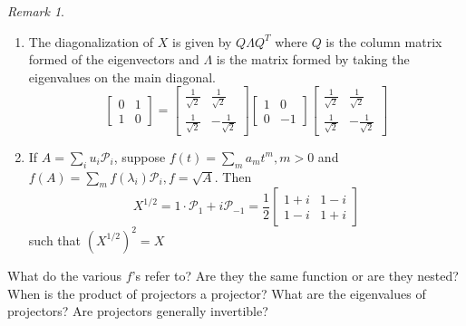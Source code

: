 \documentclass[12pt]{article}
\newcommand{\Proj}{\mathcal{P}}
\theoremstyle{definition}
\theoremstyle{remark}
\newtheorem*{remark}{Remark}
\newenvironment{question}[2][QUESTION]{\begin{trivlist}
\item[\hskip \labelsep {\bfseries #1}\hskip \labelsep {\bfseries #2.}]}{\end{trivlist}}
\begin{document}
    \begin{remark}
       \begin{enumerate}
         \item The diagonalization of $X$ is given by $Q\Lambda Q^T$ where $Q$ is the column matrix formed of the eigenvectors and $\Lambda$ is the matrix formed by taking the eigenvalues on the main diagonal.
         $$
            \begin{bmatrix}
              0 & 1 \\ 1 & 0   
            \end{bmatrix} 
            =
            \begin{bmatrix}
              \frac{1}{\sqrt{2}} & \frac{1}{\sqrt{2}} \\ \frac{1}{\sqrt{2}} & -\frac{1}{\sqrt{2}}   
            \end{bmatrix} 
            \begin{bmatrix}
              1 & 0 \\ 0 & -1   
            \end{bmatrix} 
            \begin{bmatrix}
              \frac{1}{\sqrt{2}} & \frac{1}{\sqrt{2}} \\ \frac{1}{\sqrt{2}} & -\frac{1}{\sqrt{2}}   
            \end{bmatrix} 
         $$  
         \item If $A=\sum_iu_i\Proj_i$, suppose $f(t)=\sum_ma_mt^m, m>0$ and $f(A)=\sum_mf(\lambda_i)\Proj_i, f=\sqrt{A}$.
         Then 
         $$X^{1/2}=1\cdot\Proj_{1}+i\Proj_{-1}=\frac{1}{2}
         \begin{bmatrix}
            1+i & 1-i \\ 1-i & 1+i
         \end{bmatrix}$$
         such that $\left(X^{1/2}\right)^2=X$
       \end{enumerate} 
        \begin{question}{11}
            What do the various $f$'s refer to? Are they the same function or are they nested? When is the product of projectors a projector? What are the eigenvalues of projectors? Are projectors generally invertible?\vspace{2in}
        \end{question}
    \end{remark}
\end{document}
